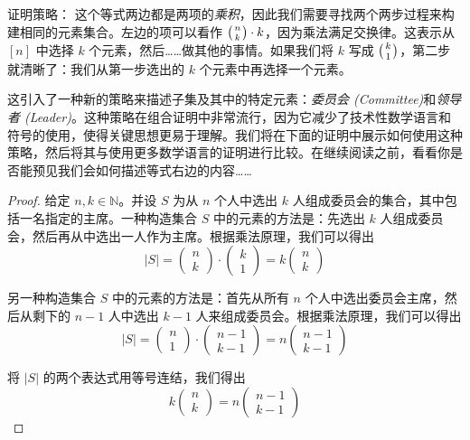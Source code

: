 \begin{questions}{证明策略：}
    这个等式两边都是两项的\emph{乘积}，因此我们需要寻找两个两步过程来构建相同的元素集合。左边的项可以看作 $\big({n \atop k}\big) \cdot k$，因为乘法满足交换律。这表示从 $[n]$ 中选择 $k$ 个元素，然后……做其他的事情。如果我们将 $k$ 写成 $\big({k \atop 1}\big)$，第二步就清晰了：我们从第一步选出的 $k$ 个元素中再选择一个元素。

    这引入了一种新的策略来描述子集及其中的特定元素：\emph{委员会 (Committee)}和\emph{领导者 (Leader)}。这种策略在组合证明中非常流行，因为它减少了技术性数学语言和符号的使用，使得关键思想更易于理解。我们将在下面的证明中展示如何使用这种策略，然后将其与使用更多数学语言的证明进行比较。在继续阅读之前，看看你是否能预见我们会如何描述等式右边的内容……
\end{questions}

\begin{proof}
    给定 $n,k \in \mathbb{N}$。并设 $S$ 为从 $n$ 个人中选出 $k$ 人组成委员会的集合，其中包括一名指定的主席。一种构造集合 $S$ 中的元素的方法是：先选出 $k$ 人组成委员会，然后再从中选出一人作为主席。根据乘法原理，我们可以得出
    \[|S| = \begin{pmatrix}n\\k\end{pmatrix} \cdot \begin{pmatrix}k\\1\end{pmatrix} = k\begin{pmatrix}n\\k\end{pmatrix}\]

    另一种构造集合 $S$ 中的元素的方法是：首先从所有 $n$ 个人中选出委员会主席，然后从剩下的 $n-1$ 人中选出 $k-1$ 人来组成委员会。根据乘法原理，我们可以得出
    \[|S| = \begin{pmatrix}n\\1\end{pmatrix} \cdot \begin{pmatrix}n-1\\k-1\end{pmatrix} = n\begin{pmatrix}n-1\\k-1\end{pmatrix}\]

    将 $|S|$ 的两个表达式用等号连结，我们得出
    \[k\begin{pmatrix}n\\k\end{pmatrix}=n\begin{pmatrix}n-1\\k-1\end{pmatrix}\]
\end{proof}

